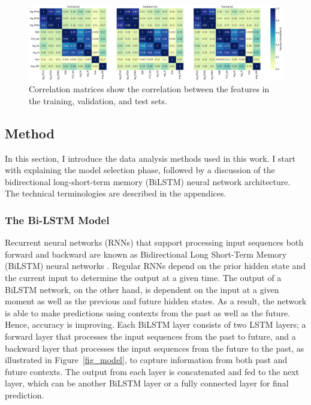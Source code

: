 \begin{figure}[htp]
	\centering
    \includegraphics[width=\textwidth]{chapter4/figs/dataset_split_corr.pdf}
    \caption{Correlation matrices show the correlation between the features in the training, validation, and test sets.}
\label{fig_dataCorr}
\end{figure}

\subsection{Method}
In this section, I introduce the data analysis methods used in this work. I start with explaining the model selection phase, followed by a discussion of the bidirectional long-short-term memory (BiLSTM) neural network architecture. The technical terminologies are described in the appendices.

\subsubsection{The Bi-LSTM Model}
Recurrent neural networks (RNNs) that support processing input sequences both forward and backward are known as Bidirectional Long Short-Term Memory (BiLSTM) neural networks \citep{schuster_1997}. Regular RNNs \citep{hochreiter_1997, kolen_2001} depend on the prior hidden state and the current input to determine the output at a given time. The output of a BiLSTM network, on the other hand, is dependent on the input at a given moment as well as the previous and future hidden states. As a result, the network is able to make predictions using contexts from the past as well as the future. Hence, accuracy is improving.
Each BiLSTM layer consists of two LSTM layers; a forward layer that processes the input sequences from the past to future, and a backward layer that processes the input sequences from the future to the past, as illustrated in Figure~\ref{fig_model}, to capture information from both past and future contexts. The output from each layer is concatenated and fed to the next layer, which can be another BiLSTM layer or a fully connected layer for final prediction.

